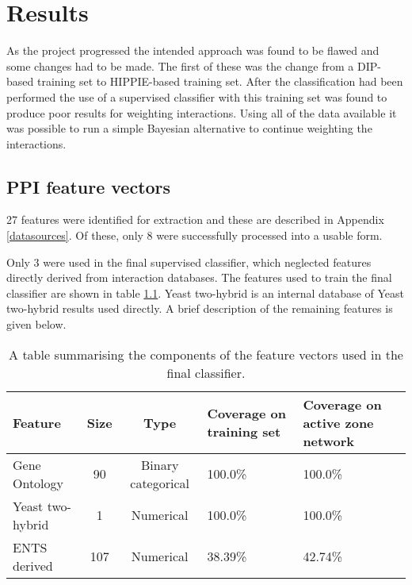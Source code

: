 \chapter{Results}
\label{results}


As the project progressed the intended approach was found to be flawed and some changes had to be made.
The first of these was the change from a \ac{DIP}-based training set to \ac{HIPPIE}-based training set.
After the classification had been performed the use of a supervised classifier with this training set was found to produce poor results for weighting interactions.
Using all of the data available it was possible to run a simple Bayesian alternative to continue weighting the interactions.

\section{\ac{PPI} feature vectors}

27 features were identified for extraction and these are described in Appendix \ref{datasources}.
Of these, only 8 were successfully processed into a usable form.

Only 3 were used in the final supervised classifier, which neglected features directly derived from interaction databases.
The features used to train the final classifier are shown in table \ref{tab:features}.
Yeast two-hybrid is an internal database of Yeast two-hybrid results used directly.
A brief description of the remaining features is given below.

\begin{table}
    \centering
    \small
    \begin{tabular}{l c c p{} p{}}
        Feature         &   Size &  Type                &  Coverage on training set &  Coverage on active zone network \\
        \hline
        Gene Ontology    &  90   &  Binary categorical  &  100.0\%                  & 100.0\%                          \\
        Yeast two-hybrid &  1    &  Numerical           &  100.0\%                  & 100.0\%                          \\
        ENTS derived     &  107  &  Numerical           &  38.39\%                  & 42.74\%                          \\
    \end{tabular}
    \caption{A table summarising the components of the feature vectors used in the final classifier.}
    \label{tab:features}
\end{table}

